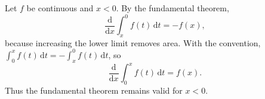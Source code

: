\begin{example}
Let $f$ be continuous and $x<0$. By the fundamental theorem,
\[
 \frac{\mathrm d}{\mathrm dx}\int_x^0 f(t)\,\mathrm dt=-f(x),
\]
because increasing the lower limit removes area.
With the convention, $\int_0^x f(t)\,\mathrm dt=-\int_x^0 f(t)\,\mathrm dt$, so
\[
 \frac{\mathrm d}{\mathrm dx}\int_0^x f(t)\,\mathrm dt=f(x).
\]
Thus the fundamental theorem remains valid for $x<0$.
\end{example}

